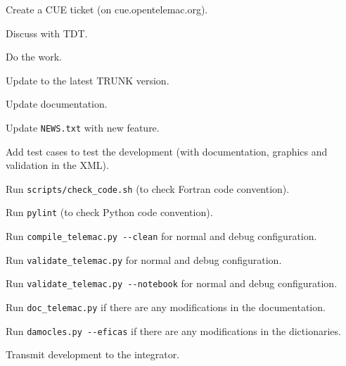 \begin{todolist}
\setlength\itemsep{0.01em}
\item Create a CUE ticket (on cue.opentelemac.org).
\item Discuss with TDT\@.
\item Do the work.
\item Update to the latest TRUNK version.
\item Update documentation.
\item Update \verb!NEWS.txt! with new feature.
\item Add test cases to test the development (with documentation, graphics and
  validation in the XML).
\item Run \verb!scripts/check_code.sh! (to check Fortran code convention).
\item Run \verb!pylint! (to check Python code convention).
\item Run \verb!compile_telemac.py --clean! for normal and debug configuration.
\item Run \verb!validate_telemac.py! for normal and debug configuration.
\item Run \verb!validate_telemac.py --notebook! for normal and debug configuration.
\item Run \verb!doc_telemac.py! if there are any modifications in the documentation.
\item Run \verb!damocles.py --eficas! if there are any modifications in the
  dictionaries.
\item Transmit development to the integrator.
\end{todolist}
